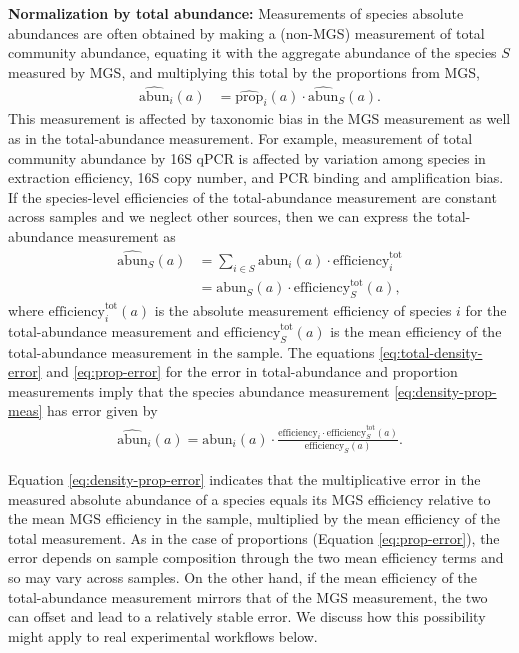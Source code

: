 \documentclass[
]{article}
\begin{document}
\textbf{Normalization by total abundance:}
Measurements of species absolute abundances are often obtained by making a (non-MGS) measurement of total community abundance, equating it with the aggregate abundance of the species \(S\) measured by MGS, and multiplying this total by the proportions from MGS,
\begin{align}
  \label{eq:density-prop-meas}
  \widehat{\text{abun}}_{i}(a) 
  &= \widehat{\text{prop}}_{i}(a) \cdot \widehat{\text{abun}}_S(a).
\end{align}
This measurement is affected by taxonomic bias in the MGS measurement as well as in the total-abundance measurement.
For example, measurement of total community abundance by 16S qPCR is affected by variation among species in extraction efficiency, 16S copy number, and PCR binding and amplification bias.
If the species-level efficiencies of the total-abundance measurement are constant across samples and we neglect other sources, then we can express the total-abundance measurement as
\begin{align}
  \label{eq:total-density-error}
  \widehat{\text{abun}}_S(a) 
  &= \sum_{i\in S} \text{abun}_i(a) \cdot \text{efficiency}^{\text{tot}}_i
\\&= \text{abun}_S(a) \cdot \text{efficiency}^{\text{tot}}_S(a),
\end{align}
where \(\text{efficiency}_{i}^{\text{tot}}(a)\) is the absolute measurement efficiency of species \(i\) for the total-abundance measurement and \(\text{efficiency}^{\text{tot}}_S(a)\) is the mean efficiency of the total-abundance measurement in the sample.
The equations \eqref{eq:total-density-error} and \eqref{eq:prop-error} for the error in total-abundance and proportion measurements imply that the species abundance measurement \eqref{eq:density-prop-meas} has error given by
\begin{align}
  \label{eq:density-prop-error}
  \widehat{\text{abun}}_{i}(a) 
  = \text{abun}_{i}(a) \cdot \frac{\text{efficiency}_{i} \cdot \text{efficiency}^{\text{tot}}_S(a)}{\text{efficiency}_S(a)}.
\end{align}

Equation \eqref{eq:density-prop-error} indicates that the multiplicative error in the measured absolute abundance of a species equals its MGS efficiency relative to the mean MGS efficiency in the sample, multiplied by the mean efficiency of the total measurement.
As in the case of proportions (Equation \eqref{eq:prop-error}), the error depends on sample composition through the two mean efficiency terms and so may vary across samples.
On the other hand, if the mean efficiency of the total-abundance measurement mirrors that of the MGS measurement, the two can offset and lead to a relatively stable error.
We discuss how this possibility might apply to real experimental workflows below.
\end{document}
